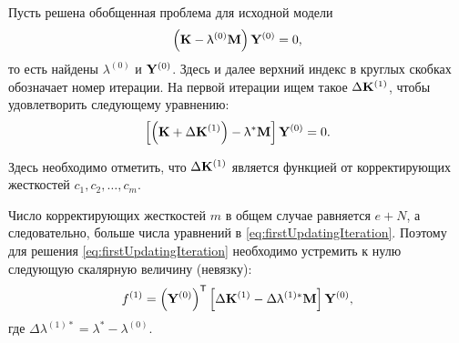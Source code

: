 Пусть решена обобщенная проблема для исходной модели
\begin{equation}
	\left( \mathbf{K} - \uplambda ^ {(0)} \mathbf{M} \right) \mathbf{Y} ^ {(0)} = 0,
	\label{eq:initEigProblem}
\end{equation}
то есть найдены $ \lambda ^ {(0)} $ и $ \mathbf{Y} ^ {(0)} $. Здесь и далее верхний индекс в круглых скобках обозначает номер итерации. На первой итерации ищем такое $ \Delta \mathbf{K} ^ {(1)} $, чтобы удовлетворить следующему уравнению:
\begin{equation}
	\left[ \left( \mathbf{K} + \Delta \mathbf{K} ^ {(1)} \right) - \uplambda ^ \ast \mathbf{M} \right] \mathbf{Y} ^ {(0)} = 0.
	\label{eq:firstUpdatingIteration}
\end{equation}

Здесь необходимо отметить, что $ \Delta \mathbf{K} ^ {(1)} $ является функцией от корректирующих жесткостей $ c_1, c_2, \hdots, c_m $. 

Число корректирующих жесткостей $ m $ в общем случае равняется $ e + N $, а следовательно, больше числа уравнений в \eqref{eq:firstUpdatingIteration}. Поэтому для решения \eqref{eq:firstUpdatingIteration} необходимо устремить к нулю следующую скалярную величину (невязку):
\begin{equation}
	f ^ {(1)} = \left( \mathbf{Y} ^ {(0)} \right) ^ \mathsf{T} \left[ \Delta \mathbf{K} ^ {(1)} - \Delta \uplambda ^ {(1) \ast} \mathbf{M} \right] \mathbf{Y} ^ {(0)},
	\label{eq:firstResidualUpdating}
\end{equation}
где $ \Delta \lambda ^ {(1) \ast} = \lambda ^ \ast - \lambda ^ {(0)} $.

